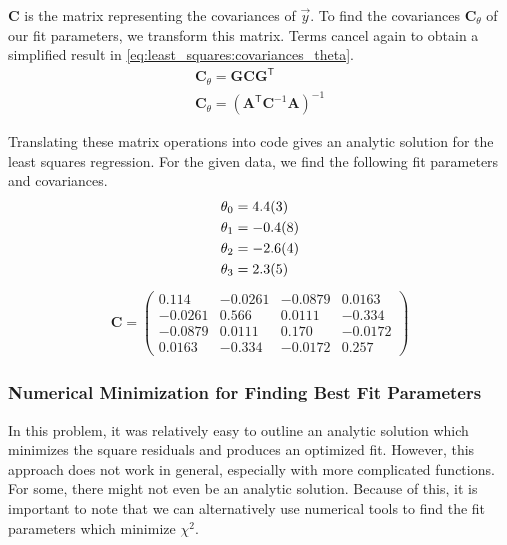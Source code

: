$\mathbf{C}$ is the matrix representing the covariances of $\vec{y}$. To find the covariances $\mathbf{C}_\theta $ of our fit parameters, we transform this matrix. Terms cancel again to obtain a simplified result in \autoref{eq:least_squares:covariances_theta}.
\begin{gather}
    \mathbf{C}_\theta = \mathbf{G} \mathbf{C} \mathbf{G}^\mathsf{T} \\
    \mathbf{C}_\theta = (\mathbf{A}^\mathsf{T} \mathbf{C}^{-1} \mathbf{A})^{-1}
    \label{eq:least_squares:covariances_theta}
\end{gather}

Translating these matrix operations into code gives an analytic solution for the least squares regression. For the given data, we find the following fit parameters and covariances.
\begin{align}
    \theta_0 &= \num{ 4.4 \pm 0.3} \\
    \theta_1 &= \num{-0.4 \pm 0.8} \\
    \theta_2 &= \num{-2.6 \pm 0.4} \\
    \theta_3 &= \num{ 2.3 \pm 0.5}
\end{align}
\begin{gather}
    \mathbf{C} = 
    \begin{pmatrix}
        \num{ 0.114 } & \num{-0.0261} & \num{-0.0879} & \num{ 0.0163} \\
        \num{-0.0261} & \num{ 0.566 } & \num{ 0.0111} & \num{-0.334 } \\
        \num{-0.0879} & \num{ 0.0111} & \num{ 0.170 } & \num{-0.0172} \\
        \num{ 0.0163} & \num{-0.334 } & \num{-0.0172} & \num{ 0.257 }
    \end{pmatrix}
\end{gather}

\subsubsection{Numerical Minimization for Finding Best Fit Parameters}

In this problem, it was relatively easy to outline an analytic solution which minimizes the square residuals and produces an optimized fit. However, this approach does not work in general, especially with more complicated functions. For some, there might not even be an analytic solution. Because of this, it is important to note that we can alternatively use numerical tools to find the fit parameters which minimize \( \chi^2 \).

